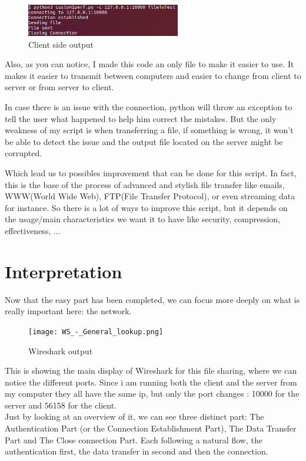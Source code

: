 \documentclass[a4paper]{article}
\begin{document}
\begin{figure}[H]
\centering
\includegraphics[width=0.6\textwidth]{clientSide.png}
\caption{Client side output}
\end{figure}

Also, as you can notice, I made this code an only file to make it easier to use. %
It makes it easier to transmit between computers and easier to change from client to server or from server to client.

In case there is an issue with the connection, python will throw an exception to tell the user what happened to help him correct the mistakes. But the only weakness of my script is when transferring a file, if something is wrong, it won't be able to detect the issue and the output file located on the server might be corrupted.

Which lead us to possibles improvement that can be done for this script.
In fact, this is the base of the process of advanced and stylish file transfer like emails, WWW(World Wide Web), FTP(File Transfer Protocol), or even streaming data for instance.
So there is a lot of ways to improve this script, but it depends on the usage/main characteristics we want it to have like security, compression, effectiveness, ...

\newpage
\section{Interpretation}

Now that the easy part has been completed, we can focus more deeply on what is really important here: the network.

\begin{figure}[H]
\centering
\texttt{[image: WS\_-\_General\_lookup.png]}
\caption{Wireshark output}
\end{figure}

This is showing the main display of Wireshark for this file sharing, where we can notice the different ports.
Since i am running both the client and the server from my computer they all have the same ip, but only the port changes : 10000 for the server and 56158 for the client.\\
Just by looking at an overview of it, we can see three distinct part: The Authentication Part (or the Connection Establishment Part), The Data Transfer Part and The Close connection Part. Each following a natural flow, the authentication first, the data transfer in second and then the connection. 
\end{document}
